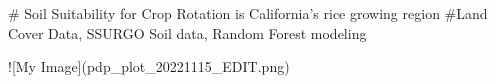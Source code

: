 # Soil Suitability for Crop Rotation is California's rice growing region
#Land Cover Data, SSURGO Soil data, Random Forest modeling



![My Image](pdp_plot_20221115_EDIT.png)